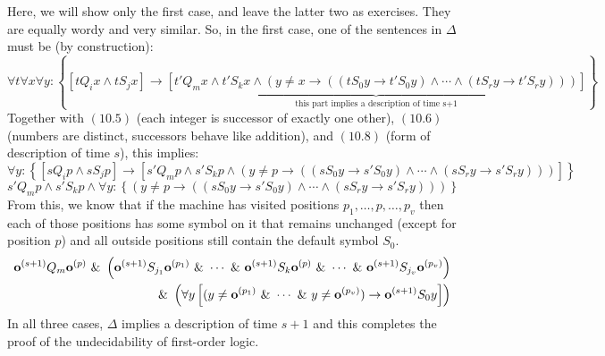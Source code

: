 Here, we will show only the first case, and leave the latter two as exercises. They are equally wordy and very similar. So, in the first case, one of the sentences in $\Delta$ must be (by construction):
$$\forall t\forall x\forall y: \left\{ \left[t Q_i x \land t S_j x\right] \to \underbrace{\left[t' Q_m x \land t' S_k x \land (y \neq x \to ((t S_0 y \to t' S_0 y) \land \cdots \land (t S_r y \to t' S_r y)))\right]}_{\text{this part implies a description of time s+1}} \right\}$$
Together with $(10.5)$ (each integer is successor of exactly one other), $(10.6)$ (numbers are distinct, successors behave like addition), and $(10.8)$ (form of description of time $s$), this implies:
$$\forall y: \left\{ \left[s Q_i p \land s S_j p\right] \to \left[s' Q_m p \land s' S_k p \land (y \neq p \to ((s S_0 y \to s' S_0 y) \land \cdots \land (s S_r y \to s' S_r y)))\right] \right\}$$
$$s' Q_m p \land s' S_k p \land \forall y: \left\{ (y \neq p \to ((s S_0 y \to s' S_0 y) \land \cdots \land (s S_r y \to s' S_r y)))\right\}$$
From this, we know that if the machine has visited positions $p_1,\ldots,p,\ldots,p_v$ then each of those positions has some symbol on it that remains unchanged (except for position $p$) and all outside positions still contain the default symbol $S_0$.
\begin{equation}
\begin{split}
\mathbf{o}^{(s+1)} Q_m \mathbf{o}^{(p)} ~\&~ \left( \mathbf{o}^{(s+1)} S_{j_1} \mathbf{o}^{(p_1)} ~\&~ \cdots ~\&~ \mathbf{o}^{(s+1)} S_k \mathbf{o}^{(p)} ~\&~ \cdots ~\&~ \mathbf{o}^{(s+1)} S_{j_v} \mathbf{o}^{(p_v)}\right) \\
~\&~ \left(\forall y \left[ (y \neq \mathbf{o}^{(p_1)} ~\&~ \cdots ~\&~ y \neq \mathbf{o}^{(p_v)}) \to \mathbf{o}^{(s+1)} S_0 y \right]\right)
\end{split}
\end{equation}
In all three cases, $\Delta$ implies a description of time $s+1$ and this completes the proof of the undecidability of first-order logic.